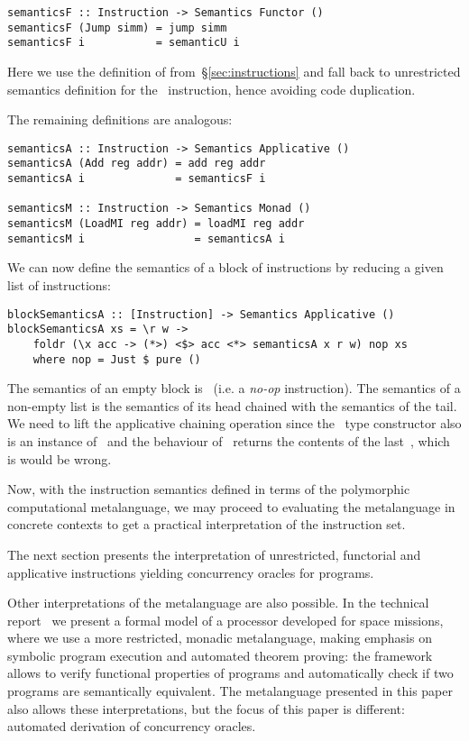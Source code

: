 \begin{verbatim}
semanticsF :: Instruction -> Semantics Functor ()
semanticsF (Jump simm) = jump simm
semanticsF i           = semanticU i
\end{verbatim}

\noindent Here we use the definition of  from~\S\ref{sec:instructions}
and fall back to unrestricted semantics definition  for
the~ instruction, hence avoiding code duplication.

The remaining definitions are analogous:

\begin{verbatim}
semanticsA :: Instruction -> Semantics Applicative ()
semanticsA (Add reg addr) = add reg addr
semanticsA i              = semanticsF i

semanticsM :: Instruction -> Semantics Monad ()
semanticsM (LoadMI reg addr) = loadMI reg addr
semanticsM i                 = semanticsA i
\end{verbatim}

We can now define the semantics of a block of instructions by reducing
a given list of instructions:

\begin{verbatim}
blockSemanticsA :: [Instruction] -> Semantics Applicative ()
blockSemanticsA xs = \r w ->
    foldr (\x acc -> (*>) <$> acc <*> semanticsA x r w) nop xs
    where nop = Just $ pure ()
\end{verbatim}

\noindent The semantics of an empty block is~ (i.e. a \emph{no-op}
instruction). The semantics of a non-empty list is the semantics of its head
chained with the semantics of the tail. We need to lift the applicative chaining
operation since the~ type constructor also is an instance
of~ and the behaviour of~\hs{*>} returns the contents of the
last~, which is would be wrong.

Now, with the instruction semantics defined in terms of the polymorphic
computational metalanguage, we may proceed to evaluating the metalanguage
in concrete contexts to get a practical interpretation of the instruction set.

The next section presents the interpretation of unrestricted, functorial and
applicative instructions yielding concurrency oracles for programs.

Other interpretations of the metalanguage are also possible. In the technical
report~\cite{mokhov2018formal} we present a formal model of a processor
developed for space missions, where we use a more restricted, monadic
metalanguage, making emphasis on symbolic program execution and automated
theorem proving: the framework allows to verify functional properties of
programs and automatically check if two programs are semantically equivalent.
The metalanguage presented in this paper also allows these interpretations,
but the focus of this paper is different: automated derivation of concurrency
oracles.